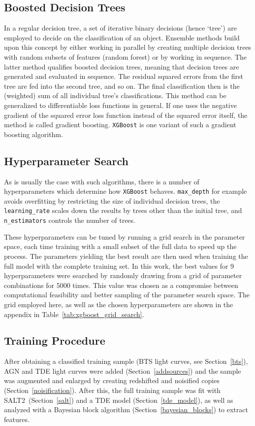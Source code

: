 \subsection{Boosted Decision Trees}
In a regular decision tree, a set of iterative binary decisions (hence `tree') are employed to decide on the classification of an object. Ensemble methods build upon this concept by either working in parallel by creating multiple decision trees with random subsets of features (random forest) or by working in sequence. The latter method qualifies boosted decision trees, meaning that decision trees are generated and evaluated in sequence. The residual squared errors from the first tree are fed into the second tree, and so on. The final classification then is the (weighted) sum of all individual tree's classifications. This method can be generalized to differentiable loss functions in general. If one uses the negative gradient of the squared error loss function instead of the squared error itself, the method is called gradient boosting. \texttt{XGBoost} is one variant of such a gradient boosting algorithm.

\subsection{Hyperparameter Search}
As is usually the case with such algorithms, there is a number of hyperparameters which determine how \texttt{XGBoost} behaves. \texttt{max\_depth} for example avoids overfitting by restricting the size of individual decision trees, the \texttt{learning\_rate} scales down the results by trees other than the initial tree, and \texttt{n\_estimators} controls the number of trees.

These hyperparameters can be tuned by running a grid search in the parameter space, each time training with a small subset of the full data to speed up the process. The parameters yielding the best result are then used when training the full model with the complete training set. In this work, the best values for 9 hyperparameters were searched by randomly drawing from a grid of parameter combinations for 5000 times. This value was chosen as a compromise between computational feasibility and better sampling of the parameter search space. The grid employed here, as well as the chosen hyperparameters are shown in the appendix in Table~\ref{tab:xgboost_grid_search}.

\subsection{Training Procedure}
After obtaining a classified training sample (BTS light curves, see Section~\ref{bts}), AGN and TDE light curves were added (Section~\ref{addsources}) and the sample was augmented and enlarged by creating redshifted and noisified copies (Section~\ref{noisification}). After this, the full training sample was fit with SALT2~(Section~\ref{salt}) and a TDE model (Section~\ref{tde_model}), as well as analyzed with a Bayesian block algorithm (Section~\ref{bayesian_blocks}) to extract features.

